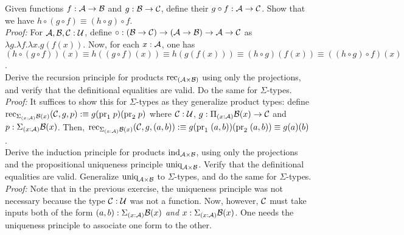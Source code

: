  Given functions $f : \mathcal{A} \to \mathcal{B}$ and $g : \mathcal{B} \to \mathcal{C}$, define their  $g \circ f : \mathcal{A} \to \mathcal{C}$. Show that we have $h \circ (g \circ f) \equiv (h \circ g) \circ f$. \\


\textit{Proof:} For $\mathcal{A},\mathcal{B},\mathcal{C} : \mathcal{U}$, define $\circ : (\mathcal{B} \to \mathcal{C}) \to (\mathcal{A} \to \mathcal{B}) \to \mathcal{A} \to \mathcal{C}$ as $\lambda g . \lambda f . \lambda x . g(f(x))$. Now, for each $x : \mathcal{A}$, one has $(h \circ (g \circ f))(x) \equiv h((g \circ f)(x)) \equiv h(g(f(x))) \equiv (h \circ g)(f(x)) \equiv ((h \circ g) \circ f)(x)$. \\



 Derive the recursion principle for products $\text{rec}_{(\mathcal{A} \times \mathcal{B})}$ using only the projections, and verify that the definitional equalities are valid. Do the same for $\Sigma$-types. \\


\textit{Proof:} It suffices to show this for $\Sigma$-types as they generalize product types: define $\text{rec}_{\Sigma_{(x : \mathcal{A})}\mathcal{B}(x)}(\mathcal{C},g,p) :\equiv g(\text{pr}_1\;p)(\text{pr}_2\;p)$ where $\mathcal{C} : \mathcal{U}$, $g : \Pi_{(x : \mathcal{A})}\mathcal{B}(x) \to \mathcal{C}$ and $p : \Sigma_{(x : \mathcal{A})}\mathcal{B}(x)$. Then, $\text{rec}_{\Sigma_{(x : \mathcal{A})}\mathcal{B}(x)}(\mathcal{C},g,(a,b)) :\equiv g(\text{pr}_1\;(a,b))(\text{pr}_2\;(a,b)) \equiv g(a)(b)$. \\


    
 Derive the induction principle for products $\text{ind}_{\mathcal{A} \times \mathcal{B}}$, using only the projections and the propositional uniqueness principle $\text{uniq}_{\mathcal{A} \times \mathcal{B}}$. Verify that the definitional equalities are valid. Generalize $\text{uniq}_{\mathcal{A} \times \mathcal{B}}$ to $\Sigma$-types, and do the same for $\Sigma$-types. \\


\textit{Proof:} Note that in the previous exercise, the uniqueness principle was not necessary because the type $\mathcal{C} : \mathcal{U}$ was not a function. Now, however, $\mathcal{C}$ must take inputs both of the form $(a,b) : \Sigma_{(x : \mathcal{A})}\mathcal{B}(x)$ \textit{and} $x : \Sigma_{(x : \mathcal{A})}\mathcal{B}(x)$. One needs the uniqueness principle to associate one form to the other.

